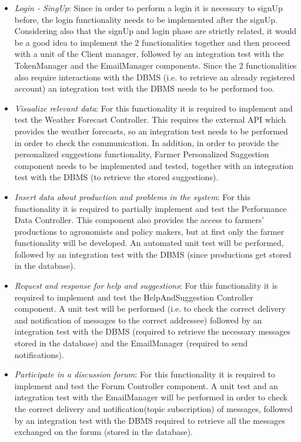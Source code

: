 \documentclass{article}
\begin{document}
    \begin{itemize}
    
        \item \textit{Login - SingUp}: Since in order to perform a login it is necessary to signUp before, the login functionality needs to be implemented after the signUp. Considering also that the signUp and login phase are strictly related, it would be a good idea to implement the 2 functionalities together and then proceed with a unit of the Client manager, followed by an integration test with the TokenManager and the EmailManager components. Since the 2 functionalities also require interactions with the DBMS (i.e. to retrieve an already registered account) an integration test with the DBMS needs to be performed too.
        
        \item \textit{Visualize relevant data}: For this functionality it is required to implement and test the Weather Forecast Controller. This requires the external API which provides the weather forecasts, so an integration test needs to be performed in order to check the communication. In addition, in order to provide the personalized suggestions functionality, Farmer Personalized Suggestion component needs to be implemented and tested, together with an integration test with the DBMS (to retrieve the stored suggestions).
        
        \item \textit{Insert data about production and problems in the system}: For this functionality it is required to partially implement and test the Performance Data Controller. This component also provides the access to farmers’ productions to agronomists and policy makers, but at first only the farmer functionality will be developed. An automated unit test will be performed, followed by an integration test with the DBMS (since productions get stored in the database).
        
        \item \textit{Request and response for help and suggestions}: For this functionality it is required to implement and test the HelpAndSuggestion Controller component. A unit test will be performed (i.e. to check the correct delivery and notification of messages to the correct addressee) followed by an integration test with the DBMS (required to retrieve the necessary messages stored in the database) and the EmailManager (required to send notifications).
        
        \item \textit{Participate in a discussion forum}: For this functionality it is required to implement and test the Forum Controller component. A unit test and an integration test with the EmailManager will be performed in order to check the correct delivery and notification(topic subscription) of messages, followed by an integration test with the DBMS required to retrieve all the messages exchanged on the forum (stored in the database).
        

\end{itemize}
\end{document}
